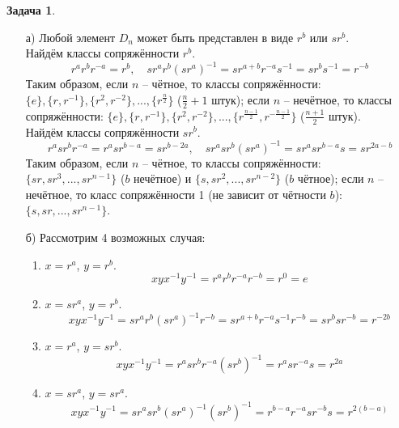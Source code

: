 \documentclass[12pt]{article}
\theoremstyle{definition}
\newtheorem{zad}{Задача}[section]
\begin{document}
\begin{zad}
\begin{itemize}
    \item[а)] Любой элемент $D_n$ может быть представлен в виде $r^b$ или $sr^b$.\\ Найдём классы сопряжённости $r^b$.
    \begin{equation}
        r^ar^br^{-a}=r^b, \quad sr^ar^b(sr^a)^{-1}=sr^{a+b}r^{-a}s^{-1}=sr^bs^{-1}=r^{-b}
    \end{equation}
    Таким образом, если $n$ -- чётное, то классы сопряжённости: $\{e\}, \{r,r^{-1}\}, \{r^2,r^{-2}\},...,\{r^{\frac{n}{2}}\}$ ($\frac{n}{2}+1$ штук); если $n$ -- нечётное, то классы сопряжённости: $\{e\}, \{r,r^{-1}\}, \{r^2,r^{-2}\},...,\{r^{\frac{n-1}{2}},r^{-\frac{n-1}{2}}\}$ ($\frac{n+1}{2}$ штук).\\
    Найдём классы сопряжённости $sr^b$.
    \begin{equation}
        r^asr^br^{-a}=r^asr^{b-a}=sr^{b-2a},\quad sr^asr^b(sr^a)^{-1}=sr^asr^{b-a}s=sr^{2a-b}
    \end{equation}
    Таким образом, если $n$ -- чётное, то классы сопряжённости: $\{sr, sr^3, ..., sr^{n-1}\}$ ($b$ нечётное) и $\{s, sr^2, ..., sr^{n-2}\}$ ($b$ чётное); если $n$ -- нечётное, то класс сопряжённости 1 (не зависит от чётности $b$): $\{s,sr,...,sr^{n-1}\}$.
    \item[б)] Рассмотрим 4 возможных случая:
    \begin{enumerate}
        \item $x=r^a$, $y=r^b$.
        \begin{equation}
            xyx^{-1}y^{-1}=r^ar^br^{-a}r^{-b}=r^0=e
        \end{equation}
        \item $x=sr^a$, $y=r^b$.
        \begin{equation}
            xyx^{-1}y^{-1}=sr^ar^b(sr^a)^{-1}r^{-b}=sr^{a+b}r^{-a}s^{-1}r^{-b}=sr^bsr^{-b}=r^{-2b}
        \end{equation}
        \item $x=r^a$, $y=sr^b$.
        \begin{equation}
            xyx^{-1}y^{-1}=r^asr^br^{-a}(sr^b)^{-1}=r^asr^{-a}s=r^{2a}
        \end{equation}
        \item $x=sr^a$, $y=sr^a$.
        \begin{equation}
            xyx^{-1}y^{-1}=sr^asr^b(sr^a)^{-1}(sr^b)^{-1}=r^{b-a}r^{-a}sr^{-b}s=r^{2(b-a)}
        \end{equation}

\end{enumerate}
\end{itemize}
\end{zad}
\end{document}
